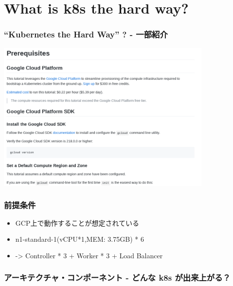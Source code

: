 \documentclass[aspectratio=169,11pt,hyperref={colorlinks=true}]{beamer}
\begin{document}
\section{What is k8s the hard way?}
\begin{frame}
  \frametitle{``Kubernetes the Hard Way'' ? - 一部紹介}
  \includegraphics[height=75mm]{images/screenshot-k8s-the-hard-way.png}
\end{frame}

\begin{frame}
  \frametitle{前提条件}
  \begin{itemize}
    \item GCP上で動作することが想定されている
    \item n1-standard-1(vCPU*1,MEM: 3.75GB) * 6
    \item[] -> Controller * 3 + Worker * 3 + Load Balancer
  \end{itemize}
\end{frame}

\begin{frame}
  \frametitle{アーキテクチャ・コンポーネント - どんな k8s が出来上がる？}
\end{frame}
\end{document}
